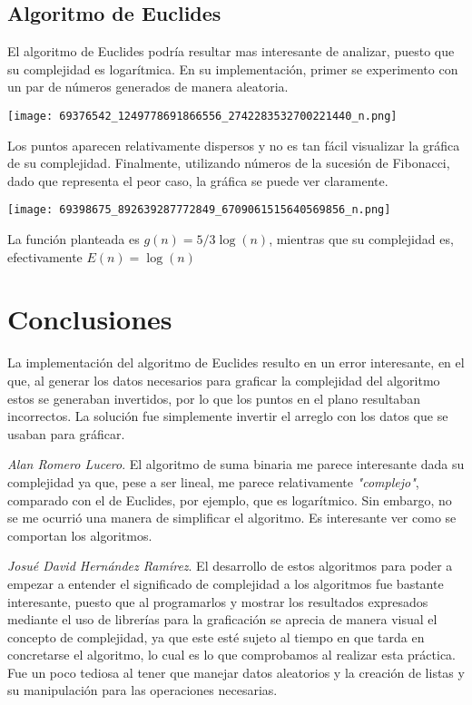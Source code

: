 \documentclass[12pt,twoside]{article}
\begin{document}
\subsection{Algoritmo de Euclides}
El algoritmo de Euclides podr\'ia resultar mas interesante de analizar, puesto que su complejidad es logarítmica. En su implementaci\'on, primer se experimento con un par de n\'umeros generados de manera aleatoria.
\begin{center}
    \texttt{[image: 69376542\_1249778691866556\_2742283532700221440\_n.png]}
\end{center}
Los puntos aparecen relativamente dispersos y no es tan f\'acil visualizar la gr\'afica de su complejidad. Finalmente, utilizando n\'umeros de la sucesi\'on de Fibonacci, dado que representa el peor caso, la gr\'afica se puede ver claramente.
\begin{center}
    \texttt{[image: 69398675\_892639287772849\_6709061515640569856\_n.png]}
\end{center}
La funci\'on planteada es $g(n)=5/3\log (n)$, mientras que su complejidad es, efectivamente $E(n) = \log (n)$
\section{Conclusiones}
La implementaci\'on del algoritmo de Euclides resulto en un error interesante, en el que, al generar los datos necesarios para graficar la complejidad del algoritmo estos se generaban invertidos, por lo que los puntos en el plano resultaban incorrectos. La soluci\'on fue simplemente invertir el arreglo con los datos que se usaban para gr\'aficar.

\textit{Alan Romero Lucero}. El algoritmo de suma binaria me parece interesante dada su complejidad ya que, pese a ser lineal, me parece relativamente \textit{"complejo"}, comparado con el de Euclides, por ejemplo, que es logarítmico. Sin embargo, no se me ocurrió una manera de simplificar el algoritmo. Es interesante ver como se comportan los algoritmos.

\textit{Josué David Hernández Ramírez}. El desarrollo de estos algoritmos para poder a empezar a entender el significado de complejidad a los algoritmos fue bastante interesante, puesto que al programarlos y mostrar los resultados expresados mediante el uso de librerías para la graficación se aprecia de manera visual el concepto de complejidad, ya que este esté sujeto al tiempo en que tarda en concretarse el algoritmo, lo cual es lo que comprobamos al realizar esta práctica. Fue un poco tediosa al tener que manejar datos aleatorios y la creación de listas y su manipulación para las operaciones necesarias.
\end{document}
